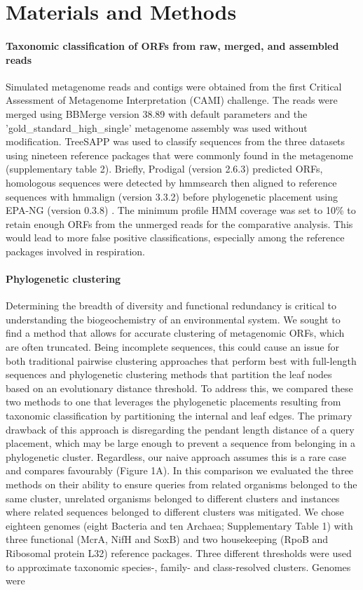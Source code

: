 \documentclass[10pt,letterpaper]{article}
\begin{document}
\section*{Materials and Methods}

\paragraph{Taxonomic classification of ORFs from raw, merged, and assembled reads}

Simulated metagenome reads and contigs were obtained from the first Critical Assessment of Metagenome Interpretation (CAMI) challenge\cite{}. The reads were merged using BBMerge version 38.89 with default parameters and the 'gold\_standard\_high\_single' metagenome assembly was used without modification. TreeSAPP was used to classify sequences from the three datasets using nineteen reference packages that were commonly found in the metagenome (supplementary table 2). Briefly, Prodigal (version 2.6.3) predicted ORFs, homologous sequences were detected by hmmsearch then aligned to reference sequences with hmmalign (version 3.3.2) before phylogenetic placement using EPA-NG (version 0.3.8) \cite{}. The minimum profile HMM coverage was set to 10\% to retain enough ORFs from the unmerged reads for the comparative analysis. This would lead to more false positive classifications, especially among the reference packages involved in respiration.

\paragraph{Phylogenetic clustering}

Determining the breadth of diversity and functional redundancy is critical to understanding the biogeochemistry of an environmental system. We sought to find a method that allows for accurate clustering of metagenomic ORFs, which are often truncated. Being incomplete sequences, this could cause an issue for both traditional pairwise clustering approaches that perform best with full-length sequences and phylogenetic clustering methods that partition the leaf nodes based on an evolutionary distance threshold. To address this, we compared these two methods to one that leverages the phylogenetic placements resulting from taxonomic classification by partitioning the internal and leaf edges. The primary drawback of this approach is disregarding the pendant length distance of a query placement, which may be large enough to prevent a sequence from belonging in a phylogenetic cluster. Regardless, our naive approach assumes this is a rare case and compares favourably (Figure 1A). 
In this comparison we evaluated the three methods on their ability to ensure queries from related organisms belonged to the same cluster, unrelated organisms belonged to different clusters and instances where related sequences belonged to different clusters was mitigated.
We chose eighteen genomes (eight Bacteria and ten Archaea; Supplementary Table 1) with three functional (McrA, NifH and SoxB) and two housekeeping (RpoB and Ribosomal protein L32) reference packages. Three different thresholds were used to approximate taxonomic species-, family- and class-resolved clusters. Genomes were 
\end{document}
